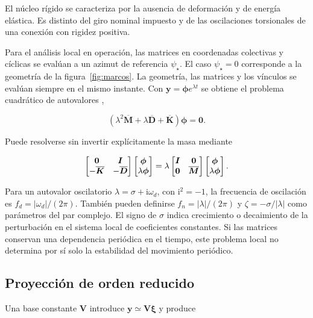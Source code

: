 El núcleo rígido se caracteriza por la ausencia de deformación y de energía elástica. Es distinto del giro nominal impuesto y de las oscilaciones torsionales de una conexión con rigidez positiva.

Para el análisis local en operación, las matrices en coordenadas colectivas y cíclicas se evalúan a un azimut de referencia $\psi_\star$. El caso $\psi_\star=0$ corresponde a la geometría de la figura~\ref{fig:marcos}. La geometría, las matrices y los vínculos se evalúan siempre en el mismo instante. Con $\bm y=\bm\phi e^{\lambda t}$ se obtiene el problema cuadrático de autovalores \citep{tisseur2001},

\begin{equation}
(\lambda^2\overline{\bm M}+\lambda\overline{\bm D}+\overline{\bm K})\bm\phi=\bm0.
\label{eq:QEP}
\end{equation}

Puede resolverse sin invertir explícitamente la masa mediante

\begin{equation}
\begin{bmatrix}\bm0&\bm I\\-\overline{\bm K}&-\overline{\bm D}\end{bmatrix}
\begin{bmatrix}\bm\phi\\\lambda\bm\phi\end{bmatrix}
=\lambda\begin{bmatrix}\bm I&\bm0\\\bm0&\overline{\bm M}\end{bmatrix}
\begin{bmatrix}\bm\phi\\\lambda\bm\phi\end{bmatrix}.
\end{equation}

Para un autovalor oscilatorio $\lambda=\sigma+\mathrm i\omega_d$, con $\mathrm i^2=-1$, la frecuencia de oscilación es $f_d=|\omega_d|/(2\pi)$. También pueden definirse $f_n=|\lambda|/(2\pi)$ y $\zeta=-\sigma/|\lambda|$ como parámetros del par complejo. El signo de $\sigma$ indica crecimiento o decaimiento de la perturbación en el sistema local de coeficientes constantes. Si las matrices conservan una dependencia periódica en el tiempo, este problema local no determina por sí solo la estabilidad del movimiento periódico.

\subsection{Proyección de orden reducido}
Una base constante $\bm V$ introduce $\bm y\simeq\bm V\bm\xi$ y produce

